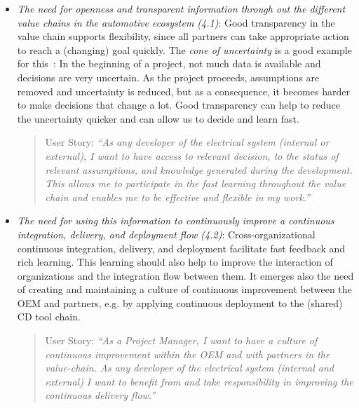 \begin{itemize}
\begin{itemize}
\item {\em The need for openness and transparent information through out the different value chains in the automotive ecosystem (4.1)}: Good transparency in the value chain supports flexibility, since all partners can take appropriate action to reach a (changing) goal quickly. 
The \emph{cone of uncertainty} is a good example for this~\cite{cone-of-uncertainty,cone-of-uncertainty2}: In the beginning of a project, not much data is available and decisions are very uncertain. 
As the project proceeds, assumptions are removed and uncertainty is reduced, but as  a consequence, it becomes harder to make decisions that change a lot. 
Good transparency can help to reduce the uncertainty quicker and can allow us to decide and learn fast.
\begin{quote}
{User Story:} 
\emph{``As any developer of the electrical system (internal or external), I want to have access to relevant decision, to the status of relevant assumptions, and knowledge generated during the development. 
This allows me to participate in the fast learning throughout the value chain and enables me to be effective and flexible in my work.''}
\end{quote}

\item {\em The need for using this information to continuously improve a continuous integration, delivery, and deployment flow (4.2)}: 
Cross-organizational continuous integration, delivery, and deployment facilitate fast feedback and rich learning.
This learning should also help to improve the interaction of organizations and the integration flow between them.
It emerges also the need of creating and maintaining a culture of continuous improvement between the OEM and partners, e.g. by applying continuous deployment to the (shared) CD tool chain.

\begin{quote}
{User Story:} 
\emph{``As a Project Manager, I want to have a culture of continuous improvement within the OEM and with partners in the value-chain. As any developer of the electrical system (internal and external) I want to benefit from and take responsibility in improving the continuous delivery flow.''}
\end{quote}


\end{itemize}
\end{itemize}
